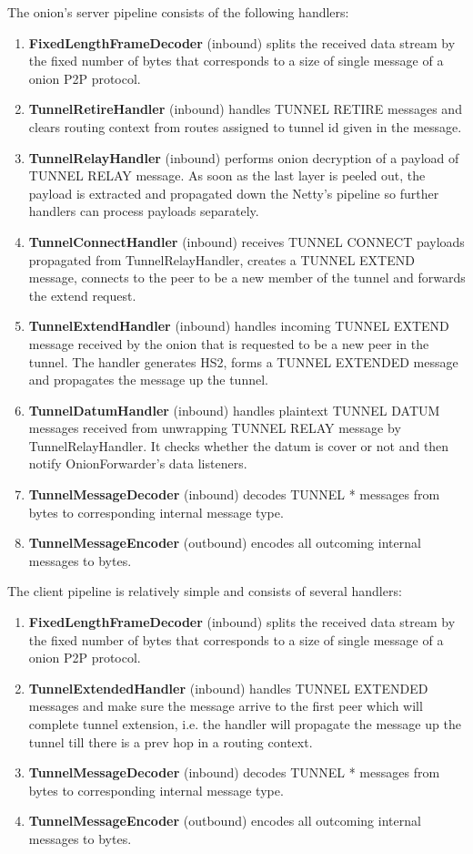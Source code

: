 \documentclass{article}
\begin{document}
The onion's server pipeline consists of the following handlers:
\begin{enumerate}
  \item \textbf{FixedLengthFrameDecoder} (inbound) splits the received data stream by the fixed number of bytes that corresponds to a size of single message of a onion P2P protocol.
  \item \textbf{TunnelRetireHandler} (inbound) handles TUNNEL RETIRE messages and clears routing context from routes assigned to tunnel id given in the message.
  \item \textbf{TunnelRelayHandler} (inbound) performs onion decryption of a payload of TUNNEL RELAY message. As soon as the last layer is peeled out, the payload is extracted and propagated down the Netty's pipeline so further handlers can process payloads separately.
  \item \textbf{TunnelConnectHandler} (inbound) receives TUNNEL CONNECT payloads propagated from TunnelRelayHandler, creates a TUNNEL EXTEND message, connects to the peer to be a new member of the tunnel and forwards the extend request.
  \item \textbf{TunnelExtendHandler} (inbound) handles incoming TUNNEL EXTEND message received by the onion that is requested to be a new peer in the tunnel. The handler generates HS2, forms a TUNNEL EXTENDED message and propagates the message up the tunnel.
  \item \textbf{TunnelDatumHandler} (inbound) handles plaintext TUNNEL DATUM messages received from unwrapping TUNNEL RELAY message by TunnelRelayHandler. It checks whether the datum is cover or not and then notify OnionForwarder's data listeners.
  \item \textbf{TunnelMessageDecoder} (inbound) decodes TUNNEL * messages from bytes to corresponding internal message type.
  \item \textbf{TunnelMessageEncoder} (outbound) encodes all outcoming internal messages to bytes.
\end{enumerate}

The client pipeline is relatively simple and consists of several handlers:
\begin{enumerate}
  \item \textbf{FixedLengthFrameDecoder} (inbound) splits the received data stream by the fixed number of bytes that corresponds to a size of single message of a onion P2P protocol.
  \item \textbf{TunnelExtendedHandler} (inbound) handles TUNNEL EXTENDED messages and make sure the message arrive to the first peer which will complete tunnel extension, i.e. the handler will propagate the message up the tunnel till there is a prev hop in a routing context.
  \item \textbf{TunnelMessageDecoder} (inbound) decodes TUNNEL * messages from bytes to corresponding internal message type.
  \item \textbf{TunnelMessageEncoder} (outbound) encodes all outcoming internal messages to bytes.
\end{enumerate}
\end{document}
